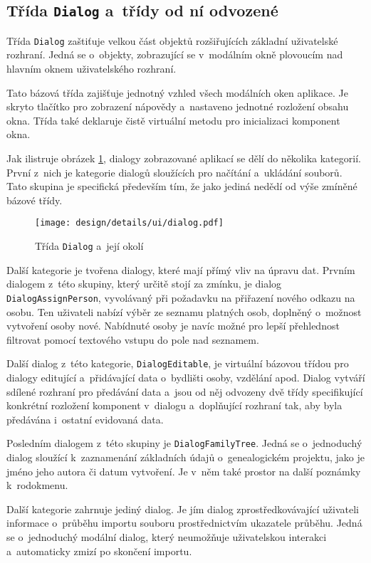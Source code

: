 		\subsection*{Třída \texttt{Dialog} a~třídy od ní odvozené}
		Třída \texttt{Dialog} zaštiťuje velkou část objektů rozšiřujících základní uživatelské rozhraní. Jedná se o~objekty, zobrazující se v~modálním okně plovoucím nad hlavním oknem uživatelského rozhraní. \par
		Tato bázová třída zajišťuje jednotný vzhled všech modálních oken aplikace. Je skryto tlačítko pro zobrazení nápovědy a~nastaveno jednotné rozložení obsahu okna. Třída také deklaruje čistě virtuální metodu pro inicializaci komponent okna.\par
		Jak ilistruje obrázek \ref{fig:designDetailDialog}, dialogy zobrazované aplikací se dělí do několika kategorií. První z~nich je kategorie dialogů sloužících pro načítání a~ukládání souborů. Tato skupina je specifická především tím, že jako jediná nedědí od výše zmíněné bázové třídy.\par
		\begin{figure}[h]
			\centering
			\texttt{[image: design/details/ui/dialog.pdf]}
			\caption{Třída \texttt{Dialog} a~její okolí}
			\label{fig:designDetailDialog}
		\end{figure}
		Další kategorie je tvořena dialogy, které mají přímý vliv na úpravu dat. Prvním dialogem z~této skupiny, který určitě stojí za zmínku, je dialog \texttt{DialogAssignPerson}, vyvolávaný při požadavku na přiřazení nového odkazu na osobu. Ten uživateli nabízí výběr ze seznamu platných osob, doplněný o~možnost vytvoření osoby nové. Nabídnuté osoby je navíc možné pro lepší přehlednost filtrovat pomocí textového vstupu do pole nad seznamem.\par
		Další dialog z~této kategorie, \texttt{DialogEditable}, je virtuální bázovou třídou pro dialogy editující a~přidávající data o~bydlišti osoby, vzdělání apod. Dialog vytváří sdílené rozhraní pro předávání data a~jsou od něj odvozeny dvě třídy specifikující konkrétní rozložení komponent v~dialogu a~doplňující rozhraní tak, aby byla předávána i~ostatní evidovaná data.\par
		Posledním dialogem z~této skupiny je \texttt{DialogFamilyTree}. Jedná se o~jednoduchý dialog sloužící k~zaznamenání základních údajů o~genealogickém projektu, jako je jméno jeho autora či datum vytvoření. Je v~něm také prostor na další poznámky k~rodokmenu.\par
		Další kategorie zahrnuje jediný dialog. Je jím dialog zprostředkovávající uživateli informace o~průběhu importu souboru prostřednictvím ukazatele průběhu. Jedná se o~jednoduchý modální dialog, který neumožňuje uživatelskou interakci a~automaticky zmizí po skončení importu.\par
